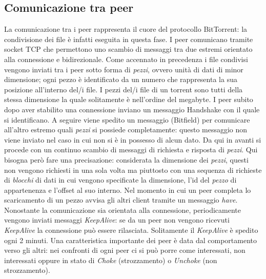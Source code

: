 \documentclass[a4]{book}
\begin{document}
\subsection{Comunicazione tra peer}
La comunicazione tra i peer rappresenta il cuore del protocollo BitTorrent: la condivisione dei file è infatti eseguita in questa fase.\newline
I peer comunicano tramite socket TCP che permettono uno scambio di messaggi tra due estremi orientato alla connessione e bidirezionale.\newline
Come accennato in precedenza i file condivisi vengono inviati tra i peer sotto forma di \textit{pezzi}, ovvero unità di dati di minor dimensione; ogni pezzo è identificato da un numero che rappresenta la sua posizione all'interno del/i file. I pezzi del/i file di un torrent sono tutti della stessa dimensione la quale solitamente è nell'ordine del megabyte.\newline
I peer subito dopo aver stabilito una connessione inviano un messaggio Handshake con il quale si identificano. A seguire viene spedito un messaggio (Bitfield) per comunicare all'altro estremo quali \textit{pezzi} si possiede completamente: questo messaggio non viene inviato nel caso in cui non si è in possesso di alcun dato.\newline
Da qui in avanti si procede con un continuo scambio di messaggi di richiesta e risposta di \textit{pezzi}. Qui bisogna però fare una precisazione: considerata la dimensione dei \textit{pezzi}, questi non vengono richiesti in una sola volta ma piuttosto con una sequenza di richieste di \textit{blocchi} di dati in cui vengono specificate la dimensione, l'id del \textit{pezzo} di appartenenza e l'offset al suo interno.\newline
Nel momento in cui un peer completa lo scaricamento di un pezzo avvisa gli altri client tramite un messaggio \textit{have}.\newline\newline
Nonostante la comunicazione sia orientata alla connessione, periodicamente vengono inviati messaggi \textit{KeepAlive}: se da un peer non vengono ricevuti \textit{KeepAlive} la connessione può essere rilasciata. Solitamente il \textit{KeepAlive} è spedito ogni 2 minuti.\newline\newline
Una caratteristica importante dei peer è data dal comportamento verso gli altri: nei confronti di ogni peer ci si può porre come interessati, non interessati oppure in stato di \textit{Choke} (strozzamento) o \textit{Unchoke} (non strozzamento).\newline
\end{document}
